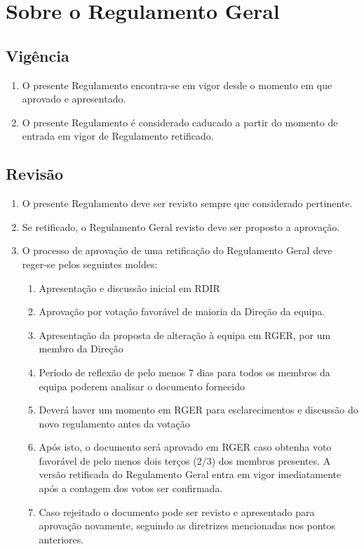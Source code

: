 \chapter{Sobre o Regulamento Geral}

\section{Vigência}
\begin{enumerate}
  \item O presente Regulamento encontra-se em vigor desde o momento em que aprovado e apresentado.
  \item O presente Regulamento é considerado caducado a partir do momento de entrada em vigor de Regulamento retificado.
\end{enumerate}

\section{Revisão}
\begin{enumerate}
  \item O presente Regulamento deve ser revisto sempre que considerado pertinente.
  \item Se retificado, o Regulamento Geral revisto deve ser proposto a aprovação.
  \item O processo de aprovação de uma retificação do Regulamento Geral deve reger-se pelos seguintes moldes:
  \begin{enumerate}
    \item Apresentação e discussão inicial em RDIR
    \item Aprovação por votação favorável de maioria da Direção da equipa.
    \item Apresentação da proposta de alteração à equipa em RGER, por um membro da Direção
    \item Período de reflexão de pelo menos 7 dias para todos os membros da equipa poderem analisar o documento fornecido
    \item Deverá haver um momento em RGER para esclarecimentos e discussão do novo regulamento antes da votação
    \item Após isto, o documento será aprovado em RGER caso obtenha voto favorável de pelo menos dois terços (2/3) dos membros presentes. A versão retificada do Regulamento Geral entra em vigor imediatamente após a contagem dos votos ser confirmada.
    \item Caso rejeitado o documento pode ser revisto e apresentado para aprovação novamente, seguindo as diretrizes mencionadas nos pontos anteriores.
  \end{enumerate}
\end{enumerate}

